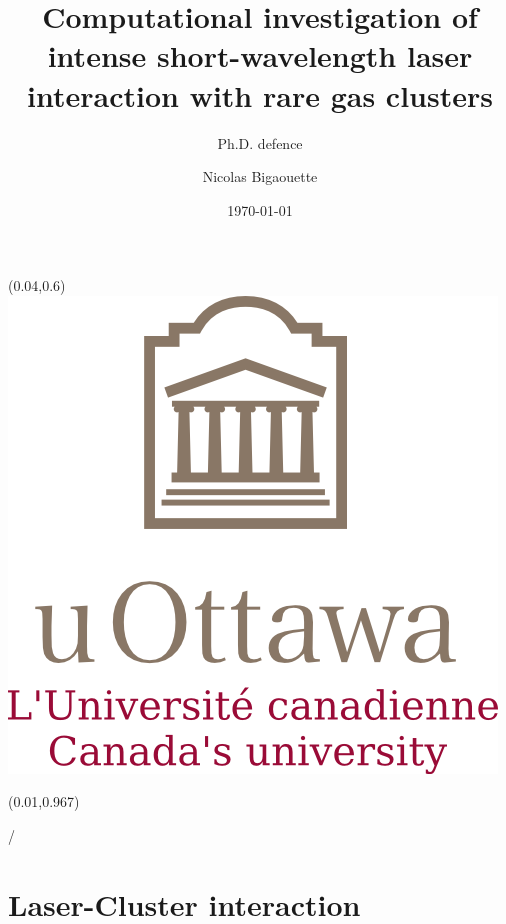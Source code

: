 \documentclass{beamer}
\title{Computational investigation of intense short-wavelength laser interaction with rare gas clusters}
\subtitle{Ph.D. defence}
\author{Nicolas Bigaouette}
\date[December 2013]{\today}
\institute{Computational Nanophotonics Group
\newline
Physics Department -- University of Ottawa}
\makeatletter
\newcommand{\framenumber}{
\begin{textblock}{0}(0.01,0.967)
\begin{scriptsize}
{\color{gray}\insertframenumber/\inserttotalframenumber}
\end{scriptsize}
\end{textblock}
}
\makeatother
\begin{document}
\begin{frame}{}
\titlepage
\begin{textblock}{0}(0.04,0.6)
\includegraphics[width=0.22\paperwidth]{figures/UofO}
\end{textblock}
\end{frame}

\setcounter{framenumber}{0}

\begin{frame}\framenumber
\tableofcontents
\end{frame}


\section{Laser-Cluster interaction}

\end{document}
